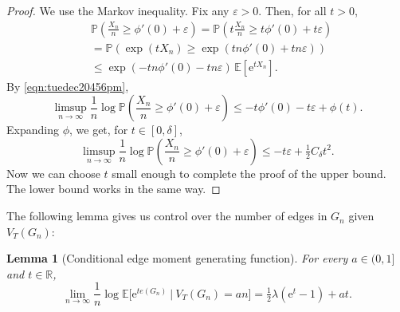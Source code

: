 \documentclass[bj,authoryear,noshowframe]{imsart}
\numberwithin{equation}{section}
\theoremstyle{plain}
\newtheorem{lem}[thm]{Lemma}
\theoremstyle{definition}
\newcommand{\e}{{\mathrm e}}
\begin{document}
\begin{proof} 
We use the Markov inequality. Fix any $\varepsilon>0$. Then, for all $t>0$,
	\begin{equation}
	\label{eqntuedec20454pm}
	\begin{aligned}
	&\mathbb{P}\left(\frac{X_n}{n}\geq \phi'(0)+\varepsilon\right) 
	= \mathbb{P}\left(t\frac{X_n}{n}\geq t\phi'(0)+t\varepsilon\right) \\
	&=\mathbb{P}\left(\exp(tX_n)\geq\exp( tn\phi'(0)+ tn\varepsilon)\right) \\
	&\leq \exp(-tn\phi'(0)-tn\varepsilon)\,\mathbb{E}\left[\e^{tX_n}\right].
	\end{aligned}
	\end{equation}
By \eqref{eqn:tuedec20456pm},
	\begin{equation}
	\limsup_{n\rightarrow \infty}\frac{1}{n}\log\mathbb{P}\left(\frac{X_n}{n}\geq \phi'(0)+\varepsilon\right)\leq -t\phi'(0)-t\varepsilon + \phi(t). 
	\end{equation}
Expanding $\phi$, we get, for $t\in [0,\delta]$,
	\begin{equation}
	\limsup_{n\rightarrow \infty}\frac{1}{n}\log\mathbb{P}\left(\frac{X_n}{n}\geq \phi'(0)+\varepsilon\right)
	\leq -t\varepsilon + {\tfrac12} C_{\delta}t^2. 
	\end{equation}
Now we can choose $t$ small enough to complete the proof of the upper bound. The lower bound works in the same way. 
\end{proof}

The following lemma gives us control over the number of edges in $G_n$ given $V_T(G_n)$:

\begin{lem}[Conditional edge moment generating function]
\label{lem:tuedec201245pm}
For every $a \in (0,1]$ and $t\in \mathbb{R}$,
	\begin{equation}
	\lim_{n\rightarrow \infty} \frac{1}{n} \log\mathbb{E}\big[\e^{te(G_n)}~|~V_T(G_n)=an\big]
	= \tfrac{1}{2}\lambda (\e^t-1)+at.
	\end{equation}
\end{lem}
\end{document}
